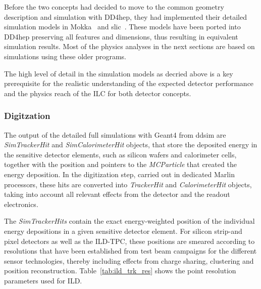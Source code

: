 Before the two concepts had decided to move to the common geometry description and simulation with DD4hep, they had
implemented their detailed simulation models in Mokka~\cite{MoradeFreitas:2002kj} and slic~\cite{bib:slic}. These models
have been ported into DD4hep preserving all features and dimensions, thus resulting in equivalent simulation results.
Most of the physics analyses in the next sections are based on simulations using these older programs.

The high level of detail in the simulation models as decried above is a key prerequisite for the
realistic understanding of the expected detector performance and the physics reach of the ILC for both detector concepts.


\subsubsection{Digitzation}

The output of the detailed full simulations with Geant4 from ddsim are \emph{SimTrackerHit} and \emph{SimCalorimeterHit} objects,
that store the deposited energy in the sensitive detector elements, such as silicon wafers and calorimeter cells, together with
the position and pointers to the \emph{MCParticle} that created the energy deposition. In the digitization step, carried out in dedicated
Marlin processors, these hits are converted into \emph{TrackerHit} and \emph{CalorimeterHit} objects,
taking into account all relevant effects from the detector and the readout electronics.

The \emph{SimTrackerHits} contain the exact energy-weighted position of the individual energy depositions in a given sensitive
detector element. For silicon strip-and pixel detectors as well as the ILD-TPC, these positions are smeared according to
resolutions that have been established from test beam campaigns for the different sensor technologies, thereby including effects
from charge sharing, clustering and position reconstruction. Table~\ref{tab:ild_trk_res} shows the point resolution parameters used for ILD.



